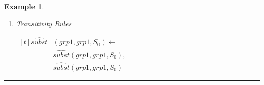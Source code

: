 \documentclass[10pt, twocolumn]{article}
\newtheorem{examp}{Example}
\newenvironment{example}{\begin{examp}\rm}{\rule{2mm}{2mm}\end{examp}}
\begin{document}
\begin{example}
\begin{enumerate}
              \begin{math}
                \begin{aligned}[t]
                  \hat{holds}&(alice, read, file, S_{1}) \leftarrow \\
                  & \hat{holds}(grp3, read, file, S_{1}), \\
                  & \hat{memb}(alice, grp3, S_{1}), \\
                  & not \lnot \hat{holds}(alice, read, file, S_{1}) \\
                  \lnot \hat{holds}&(alice, read, file, S_{1}) \leftarrow \\
                  & \lnot \hat{holds}(grp3, read, file, S_{1}), \\
                  & \hat{memb}(alice, grp3, S_{1})
                \end{aligned}
              \end{math}

              \begin{math}
                \begin{aligned}[t]
                  \hat{holds}&(alice, write, file, S_{1}) \leftarrow \\
                  & \hat{holds}(grp3, write, file, S_{1}), \\
                  & \hat{memb}(alice, grp3, S_{1}), \\
                  & not \lnot \hat{holds}(alice, write, file, S_{1}) \\
                  \lnot \hat{holds}&(alice, write, file, S_{1}) \leftarrow \\
                  & \lnot \hat{holds}(grp3, write, file, S_{1}), \\
                  & \hat{memb}(alice, grp3, S_{1})
                \end{aligned}
              \end{math}

            \item
              Transitivity Rules

              \begin{math}
                \begin{aligned}[t]
                  \hat{subst}&(grp1, grp1, S_{0}) \leftarrow \\
                  & \hat{subst}(grp1, grp1, S_{0}), \\
                  & \hat{subst}(grp1, grp1, S_{0})
                \end{aligned}
              \end{math}


\end{enumerate}
\end{example}
\end{document}

